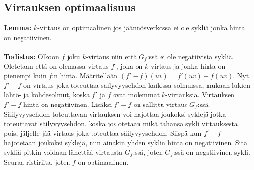 \documentclass[a4paper, 11pt]{article}
\begin{document}
\subsection*{Virtauksen optimaalisuus}
\textbf{Lemma:} $k$-virtaus on optimaalinen jos jäännösverkossa ei ole sykliä jonka
hinta on negatiivinen.\\\\
\noindent
\textbf{Todistus:} Olkoon $f$ joku $k$-virtaus niin että $G_f$:ssä ei ole negatiivista
sykliä. Oletetaan että on olemassa virtaus $f'$, joka on $k$-virtaus ja jonka hinta on pienempi 
kuin $f$:n hinta. Määritellään
$(f' - f)(uv) = f'(uv) - f(uv)$. Nyt $f' - f$ on virtaus joka toteuttaa säilyvyysehdon kaikissa 
solmuissa, mukaan lukien lähtö- ja kohdesolmut, koska $f'$ ja $f$ ovat molemmat $k$-virtauksia.
Virtauksen $f' - f$ hinta on negatiivinen. Lisäksi $f' - f$ on sallittu
virtaus $G_f$:ssä. Säilyvyysehdon toteuttavan virtauksen voi hajottaa joukoksi syklejä
jotka toteuttavat säilyvyysehdon, koska jos otetaan mikä tahansa
sykli virtauksesta pois, jäljelle jää virtaus joka toteuttaa säilyvyysehdon.
Siispä kun $f' - f$ hajotetaan joukoksi syklejä, niin ainakin yhden syklin hinta on negatiivinen.
Sitä sykliä pitkin voidaan lähettää virtausta $G_f$:ssä, joten $G_f$:ssä on negatiivinen sykli.
Seuraa ristiriita, joten $f$ on optimaalinen.
\noindent
\end{document}

